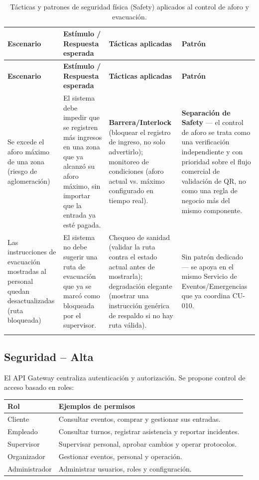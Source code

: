 \documentclass[12pt,a4paper]{article}
\begin{document}
\begin{center}
\begin{longtable}{p{2.6cm}p{4.7cm}p{3.6cm}p{2.9cm}}
\toprule
\textbf{Escenario} & \textbf{Estímulo / Respuesta esperada} & \textbf{Tácticas aplicadas} & \textbf{Patrón}\\
\midrule
\endfirsthead
\toprule
\textbf{Escenario} & \textbf{Estímulo / Respuesta esperada} & \textbf{Tácticas aplicadas} & \textbf{Patrón}\\
\midrule
\endhead
Se excede el aforo máximo de una zona (riesgo de aglomeración) &
El sistema debe impedir que se registren más ingresos en una zona que ya alcanzó su aforo
máximo, sin importar que la entrada ya esté pagada. &
\textbf{Barrera/Interlock} (bloquear el registro de ingreso, no solo advertirlo); monitoreo de
condiciones (aforo actual vs. máximo configurado en tiempo real). &
\textbf{Separación de Safety} — el control de aforo se trata como una verificación independiente
y con prioridad sobre el flujo comercial de validación de QR, no como una regla de negocio más
del mismo componente.\\[0.5em]

Las instrucciones de evacuación mostradas al personal quedan desactualizadas (ruta bloqueada) &
El sistema no debe sugerir una ruta de evacuación que ya se marcó como bloqueada por el
supervisor. &
Chequeo de sanidad (validar la ruta contra el estado actual antes de mostrarla); degradación
elegante (mostrar una instrucción genérica de respaldo si no hay ruta válida). &
Sin patrón dedicado — se apoya en el mismo Servicio de Eventos/Emergencias que ya coordina CU-010.\\
\bottomrule
\caption{Tácticas y patrones de seguridad física (Safety) aplicados al control de aforo y
evacuación.}
\label{tab:tacticas-safety}
\end{longtable}
\end{center}

\subsection{Seguridad -- Alta}

El API Gateway centraliza autenticación y autorización. Se propone control de acceso basado en roles:

\begin{center}
\begin{tabular}{p{3cm}p{8cm}}
\toprule
\textbf{Rol} & \textbf{Ejemplos de permisos}\\
\midrule
Cliente & Consultar eventos, comprar y gestionar sus entradas.\\
Empleado & Consultar turnos, registrar asistencia y reportar incidentes.\\
Supervisor & Supervisar personal, aprobar cambios y operar protocolos.\\
Organizador & Gestionar eventos, personal y operación.\\
Administrador & Administrar usuarios, roles y configuración.\\
\bottomrule
\end{tabular}
\end{center}
\end{document}
